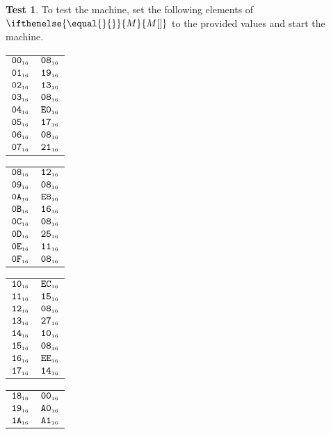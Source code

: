\documentclass[a4paper,12pt]{article}
\makeatletter
\newcommand{\num}[1]{\texttt{#1}}
\newcommand{\hex}[1]{\num{#1}_{\textup{\tiny 16}}}
\newcommand{\MEM}[1]{\ifthenelse{\equal{#1}{}}{M}{M[#1]}}
\theoremstyle{definition}
\newtheorem{test}{Test}
\newenvironment{memtable}{%
  \begin{trivlist}
    \item
    }{%
    \end{trivlist}}
\newenvironment{memcolumn}{%
  \begin{tabular}{@{}ll@{}}
    \hline}
    {%
    \hline
  \end{tabular}}
\newcommand{\memspace}{\qquad}
\makeatother
\begin{document}
\begin{test}
  To test the machine, set the following elements of $\MEM{}$ to the provided values and start the machine.
  \begin{memtable}
    \begin{memcolumn}
      $\hex{00}$ & $\hex{08}$ \\
      $\hex{01}$ & $\hex{19}$ \\
      $\hex{02}$ & $\hex{13}$ \\
      $\hex{03}$ & $\hex{08}$ \\
      $\hex{04}$ & $\hex{E0}$ \\
      $\hex{05}$ & $\hex{17}$ \\
      $\hex{06}$ & $\hex{08}$ \\
      $\hex{07}$ & $\hex{21}$ \\
    \end{memcolumn}
    \memspace
    \begin{memcolumn}
      $\hex{08}$ & $\hex{12}$ \\
      $\hex{09}$ & $\hex{08}$ \\
      $\hex{0A}$ & $\hex{E8}$ \\
      $\hex{0B}$ & $\hex{16}$ \\
      $\hex{0C}$ & $\hex{08}$ \\
      $\hex{0D}$ & $\hex{25}$ \\
      $\hex{0E}$ & $\hex{11}$ \\
      $\hex{0F}$ & $\hex{08}$ \\
    \end{memcolumn}
    \memspace
    \begin{memcolumn}
      $\hex{10}$ & $\hex{EC}$ \\
      $\hex{11}$ & $\hex{15}$ \\
      $\hex{12}$ & $\hex{08}$ \\
      $\hex{13}$ & $\hex{27}$ \\
      $\hex{14}$ & $\hex{10}$ \\
      $\hex{15}$ & $\hex{08}$ \\
      $\hex{16}$ & $\hex{EE}$ \\
      $\hex{17}$ & $\hex{14}$ \\
    \end{memcolumn}
    \memspace
    \begin{memcolumn}
      $\hex{18}$ & $\hex{00}$ \\
      $\hex{19}$ & $\hex{A0}$ \\
      $\hex{1A}$ & $\hex{A1}$ \\

\end{memcolumn}
\end{memtable}
\end{test}
\end{document}
